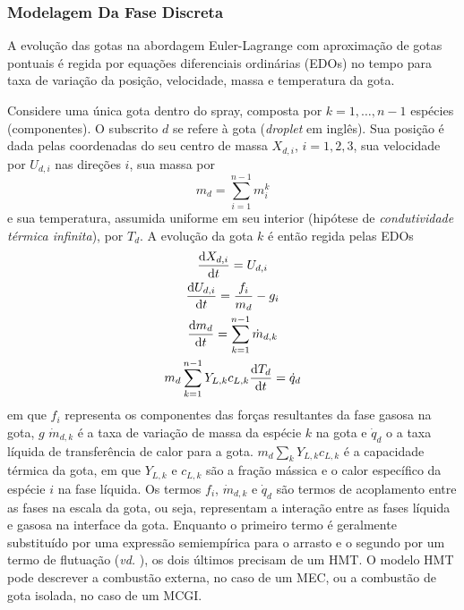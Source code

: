     

\subsubsection{Modelagem Da Fase Discreta} \label{sec:gotas}

A evolução das gotas na abordagem Euler-Lagrange com aproximação de gotas pontuais é regida por equações diferenciais ordinárias (EDOs) no tempo para taxa de variação da posição, velocidade, massa e temperatura da gota.

Considere uma única gota dentro do spray, composta por $k=1,\ldots,n-1$ espécies (componentes).
O subscrito $d$ se refere à gota (\emph{droplet} em inglês).
Sua posição é dada pelas coordenadas do seu centro de massa $X_{d,i}$, $i=1,2,3$, sua velocidade por $U_{d,i}$ nas direções $i$, sua massa por 
\begin{equation}    
    m_d = \sum_{i=1}^{n-1} m_{i}^k
\end{equation}
e sua temperatura, assumida uniforme em seu interior (hipótese de \emph{condutividade térmica infinita}), por $T_d$.
A evolução da gota $k$ é então regida pelas EDOs \cite{JennyB2012}
\begin{gather}
    \frac{\mathrm{d} X_{d,i}}{\mathrm{d} t} = U_{d,i}
    \label{eq:Ud}\\
    \frac{\mathrm{d} U_{d,i}}{\mathrm{d} t} =
    \frac{f_i}{ m_{d}} -
    g_i 
    \label{eq:Xd} \\
    \frac{\mathrm{d} m_{d}}{\mathrm{d} t} = \sum_{k=1}^{n-1} \dot m_{d,k}
    \label{eq:md} \\
    m_d \sum_{k=1}^{n-1} Y_{L,k} c_{L,k} \frac{\mathrm{d} T_d}{\mathrm{d} t} = \dot q_d
    \label{eq:Td}
\end{gather}
em que $f_i$ representa os componentes das forças resultantes da fase gasosa na gota, $g$
$\dot m_{d,k}$ é a taxa de variação de massa da espécie $k$ na gota e $\dot q_d$ o a taxa líquida de transferência de calor para a gota.
$ m_d \sum_k Y_{L,k} c_{L,k}$ é a capacidade térmica da gota, em que 
$Y_{L,k}$ e $c_{L,k}$ são a fração mássica e o calor específico da  espécie $i$ na fase líquida.
Os termos $f_i$, $\dot m_{d,k}$ e $\dot q_d$ são termos de acoplamento entre as fases na escala da gota, ou seja, representam a interação entre as fases líquida e gasosa na interface da gota.
Enquanto o primeiro termo é geralmente substituído por uma expressão semiempírica para o arrasto e o segundo por um termo de flutuação (\emph{vd.} \cite[p. 16]{JennyB2012}), os dois últimos precisam de um HMT.
O modelo HMT pode descrever a combustão externa, no caso de um MEC, ou a combustão de gota isolada, no caso de um MCGI.  

